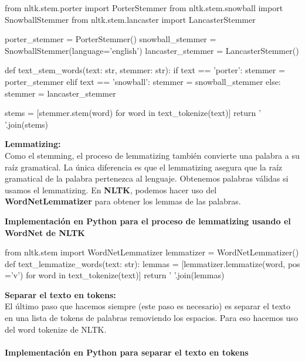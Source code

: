 \documentclass{llncs}
\begin{document}
\begin{python}
    from nltk.stem.porter import PorterStemmer
    from nltk.stem.snowball import SnowballStemmer
    from nltk.stem.lancaster import LancasterStemmer

    porter_stemmer =  PorterStemmer()
    snowball_stemmer = SnowballStemmer(language='english')
    lancaster_stemmer = LancasterStemmer()
\end{python}


\begin{python}
    def text_stem_words(text: str, stemmer: str):
        if text == 'porter':
            stemmer = porter_stemmer
        elif text == 'snowball':
            stemmer = snowball_stemmer
        else:
            stemmer = lancaster_stemmer

        stems = [stemmer.stem(word) for word in text_tokenize(text)]
        return ' '.join(stems)
\end{python}

\noindent
\textbf{Lemmatizing:}\\
Como el stemming, el proceso de lemmatizing también convierte una palabra
a su raíz gramatical. La única diferencia es que el lemmatizing asegura que
la raíz gramatical de la palabra pertenezca al lenguaje. Obtenemos palabras
válidas si usamos el lemmatizing. En \textbf{NLTK}, podemos hacer uso del 
\textbf{WordNetLemmatizer} para obtener los lemmas de las palabras. 

\noindent
\textbf{Implementación en Python para el proceso de lemmatizing usando el WordNet de NLTK}

\begin{python}
from nltk.stem import WordNetLemmatizer
lemmatizer = WordNetLemmatizer()
def text_lemmatize_words(text: str):
lemmas = [lemmatizer.lemmatize(word, pos ='v') for word in text_tokenize(text)]
return ' '.join(lemmas)
\end{python}

\noindent
\textbf{Separar el texto en tokens:}\\
El último paso que hacemos siempre (este paso es necesario) 
es separar el texto en una lista de tokens de palabras 
removiendo los espacios. Para eso hacemos uso del word tokenize 
de NLTK.
\\\\
\noindent
\textbf{Implementación en Python para separar el texto en tokens}
\end{document}

